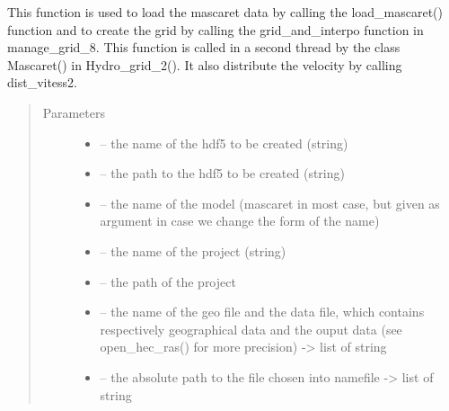 \documentclass[letterpaper,10pt,english]{sphinxmanual}
\begin{document}

\begin{fulllineitems}
\label{\detokenize{index:src.mascaret.load_mascaret_and_create_grid}}
This function is used to load the mascaret data by calling the load\_mascaret() function and to create the grid
by calling the grid\_and\_interpo function in manage\_grid\_8. This function is called in a second thread by the class
Mascaret() in Hydro\_grid\_2(). It also distribute the velocity by calling dist\_vitess2.
\begin{quote}\begin{description}
\item[{Parameters}] \leavevmode\begin{itemize}
\item {} 
 -- the name of the hdf5 to be created (string)

\item {} 
 -- the path to the hdf5 to be created (string)

\item {} 
 -- the name of the model (mascaret in most case, but given as argument in case we change
the form of the name)

\item {} 
 -- the name of the project (string)

\item {} 
 -- the path of the project

\item {} 
 -- the name of the geo file and the data file, which contains respectively geographical data and
the ouput data (see open\_hec\_ras() for more precision) -\textgreater{} list of string

\item {} 
 -- the absolute path to the file chosen into namefile -\textgreater{} list of string


\end{itemize}
\end{description}
\end{quote}
\end{fulllineitems}
\end{document}
